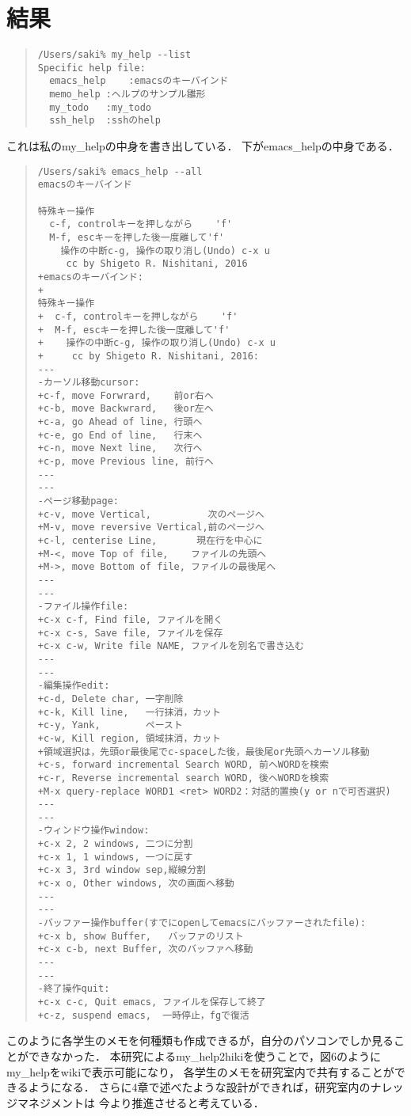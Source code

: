 \section{結果}
\begin{quote}\begin{verbatim}
/Users/saki% my_help --list
Specific help file:
  emacs_help	:emacsのキーバインド
  memo_help	:ヘルプのサンプル雛形
  my_todo	:my_todo
  ssh_help	:sshのhelp
\end{verbatim}\end{quote}

これは私のmy\_helpの中身を書き出している．
下がemacs\_helpの中身である．

\begin{quote}\begin{verbatim}
/Users/saki% emacs_help --all
emacsのキーバインド

特殊キー操作
  c-f, controlキーを押しながら    'f'
  M-f, escキーを押した後一度離して'f'
    操作の中断c-g, 操作の取り消し(Undo) c-x u
     cc by Shigeto R. Nishitani, 2016
+emacsのキーバインド:
+
特殊キー操作
+  c-f, controlキーを押しながら    'f'
+  M-f, escキーを押した後一度離して'f'
+    操作の中断c-g, 操作の取り消し(Undo) c-x u
+     cc by Shigeto R. Nishitani, 2016:
---
-カーソル移動cursor:
+c-f, move Forwrard,    前or右へ
+c-b, move Backwrard,   後or左へ
+c-a, go Ahead of line, 行頭へ
+c-e, go End of line,   行末へ
+c-n, move Next line,   次行へ
+c-p, move Previous line, 前行へ
---
---
-ページ移動page:
+c-v, move Vertical,          次のページへ
+M-v, move reversive Vertical,前のページへ
+c-l, centerise Line,       現在行を中心に
+M-<, move Top of file,    ファイルの先頭へ
+M->, move Bottom of file, ファイルの最後尾へ
---
---
-ファイル操作file:
+c-x c-f, Find file, ファイルを開く
+c-x c-s, Save file, ファイルを保存
+c-x c-w, Write file NAME, ファイルを別名で書き込む
---
---
-編集操作edit:
+c-d, Delete char, 一字削除
+c-k, Kill line,   一行抹消，カット
+c-y, Yank,        ペースト
+c-w, Kill region, 領域抹消，カット
+領域選択は，先頭or最後尾でc-spaceした後，最後尾or先頭へカーソル移動
+c-s, forward incremental Search WORD, 前へWORDを検索
+c-r, Reverse incremental search WORD, 後へWORDを検索
+M-x query-replace WORD1 <ret> WORD2：対話的置換(y or nで可否選択)
---
---
-ウィンドウ操作window:
+c-x 2, 2 windows, 二つに分割
+c-x 1, 1 windows, 一つに戻す
+c-x 3, 3rd window sep,縦線分割
+c-x o, Other windows, 次の画面へ移動
---
---
-バッファー操作buffer(すでにopenしてemacsにバッファーされたfile):
+c-x b, show Buffer,   バッファのリスト
+c-x c-b, next Buffer, 次のバッファへ移動
---
---
-終了操作quit:
+c-x c-c, Quit emacs, ファイルを保存して終了
+c-z, suspend emacs,  一時停止，fgで復活
\end{verbatim}\end{quote}

このように各学生のメモを何種類も作成できるが，自分のパソコンでしか見ることができなかった．
本研究によるmy\_help2hikiを使うことで，図6のようにmy\_helpをwikiで表示可能になり，
各学生のメモを研究室内で共有することができるようになる．
さらに4章で述べたような設計ができれば，研究室内のナレッジマネジメントは
今より推進させると考えている．
